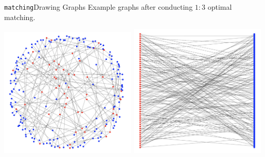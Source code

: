 \documentclass[11pt, compress]{beamer}
\begin{document}
\begin{frame}{\texttt{matching}}{Drawing Graphs}
	Example graphs after conducting $1:3$ optimal matching.
	\begin{center}
		\includegraphics[width=0.49\textwidth]{../paper/img/draw_examples/draw.png}
		\includegraphics[width=0.49\textwidth]{../paper/img/draw_examples/draw_bipartite.png}
	\end{center}
\end{frame}
\end{document}
